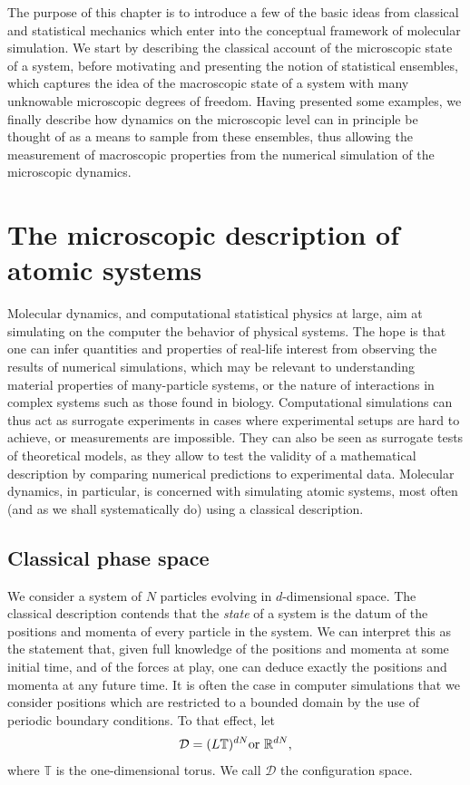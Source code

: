 The purpose of this chapter is to introduce a few of the basic ideas from classical and statistical mechanics which enter into the conceptual framework of molecular simulation.
We start by describing the classical account of the microscopic state of a system, before motivating and presenting the notion of statistical ensembles, which captures the idea of the macroscopic state of a system with many unknowable microscopic degrees of freedom.
Having presented some examples, we finally describe how dynamics on the microscopic level can in principle be thought of as a means to sample from these ensembles, thus allowing the measurement of macroscopic properties from the numerical simulation of the microscopic dynamics.

\section{The microscopic description of atomic systems}
Molecular dynamics, and computational statistical physics at large, aim at simulating on the computer the behavior of physical systems.
The hope is that one can infer quantities and properties of real-life interest from observing the results of numerical simulations, which may be relevant to understanding material properties of many-particle systems, or the nature of interactions in complex systems such as those found in biology.
Computational simulations can thus act as surrogate experiments in cases where experimental setups are hard to achieve, or measurements are impossible.
They can also be seen as surrogate tests of theoretical models, as they allow to test the validity of a mathematical description by comparing numerical predictions to experimental data. Molecular dynamics, in particular, is concerned with simulating atomic systems, most often (and as we shall systematically do) using a classical description.

\subsection{Classical phase space}

We consider a system of $N$ particles evolving in $d$-dimensional space.
The classical description contends that the \textit{state} of a system is the datum of the positions and momenta of every particle in the system.
We can interpret this as the statement that, given full knowledge of the positions and momenta at some initial time, and of the forces at play, one can deduce exactly the positions and momenta at any future time.
It is often the case in computer simulations that we consider positions which are restricted to a bounded domain by the use of periodic boundary conditions. To that effect, let
$$ \mathcal D = (L\mathbb T)^{dN} \text{or } \mathbb{R}^{dN}, $$
where $\mathbb T$ is the one-dimensional torus. We call $\mathcal D$ the configuration space.

